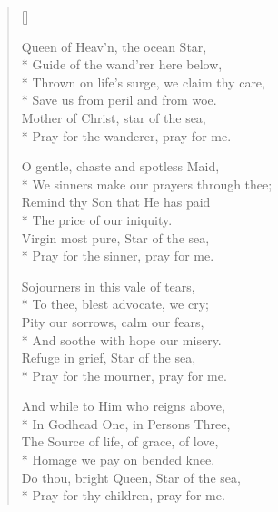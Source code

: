 \newHymn

\settowidth{\versewidth}{Hail, Queen of Heav'n, the ocean Star}


\begin{verse}[\versewidth]

\begin{patverse}
 Queen of Heav'n, the ocean Star,\\*
    Guide of the wand'rer here below,\\*
        Thrown on life's
surge, we claim thy care,\\*
    Save us from peril
    and from woe.\\
        Mother of
Christ, star
of the sea,\\*
    Pray for
    the
    wanderer,
    pray for me.
\end{patverse}

\begin{patverse}
O gentle, chaste and spotless Maid,\\*
    We sinners make our prayers through thee;\\
Remind thy Son that He has paid\\*
    The price of our iniquity.\\
        Virgin most pure, Star of the sea,\\*
    Pray for the sinner, pray for me.
\end{patverse}

\begin{patverse}
Sojourners in this vale of tears,\\*
    To thee, blest advocate, we cry;\\
        Pity our sorrows, calm our fears,\\*
    And soothe with hope our misery.\\
        Refuge in grief, Star of the sea,\\*
    Pray for the mourner, pray for me.
\end{patverse}

\begin{patverse}
And while to Him who reigns above,\\*
    In Godhead One, in Persons Three,\\
        The Source of life, of
grace, of love,\\*
    Homage we pay on
    bended knee.\\
        Do thou,
bright Queen,
Star of the sea,\\*
    Pray for
    thy
    children,
    pray for me.
\end{patverse}
    
\end{verse}

    
